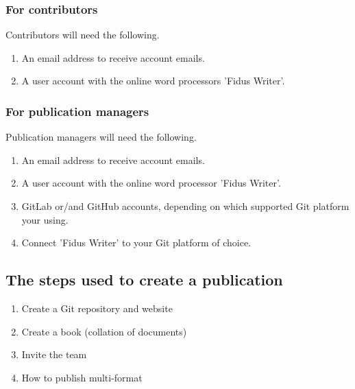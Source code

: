 \documentclass{article}
\begin{document}
\subsubsection{For contributors}\label{H5614484}



Contributors will need the following.

\begin{enumerate}
\item An email address to receive account emails.


\item A user account with the online word processors 'Fidus Writer'.


\end{enumerate}

\subsubsection{For publication managers}\label{H9374516}



Publication managers will need the following.

\begin{enumerate}
\item An email address to receive account emails.


\item A user account with the online word processor 'Fidus Writer'.


\item GitLab or/and GitHub accounts, depending on which supported Git platform your using.


\item Connect 'Fidus Writer' to your Git platform of choice.


\end{enumerate}

\subsection{The steps used to create a publication}\label{H3159430}


\begin{enumerate}
\item Create a Git repository and website


\item Create a book (collation of documents)


\item Invite the team


\item How to publish multi-format


\end{enumerate}
\end{document}
